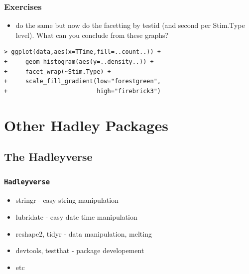 \documentclass[xcolor={table},c]{beamer}
\begin{document}
\begin{frame}[fragile]\frametitle{Exercises}
  \begin{itemize}
  \item do the same but now do the facetting by testid (and second per Stim.Type level). What can you conclude from these graphs?
  \end{itemize}
\begin{verbatim}
> ggplot(data,aes(x=TTime,fill=..count..)) +
+     geom_histogram(aes(y=..density..)) +
+     facet_wrap(~Stim.Type) +
+     scale_fill_gradient(low="forestgreen",
+                         high="firebrick3")
\end{verbatim}
\begin{center}
\end{center}
\end{frame}


\section{Other Hadley Packages}


\subsection{The Hadleyverse}
\begin{frame}\frametitle{\texttt{Hadleyverse}}
  \begin{itemize}
  \item stringr - easy string manipulation
  \item lubridate - easy date time manipulation
  \item reshape2, tidyr - data manipulation, melting
  \item devtools, testthat - package developement
  \item etc
  \end{itemize}
\end{frame}


\appendix
\flushlinkimages
\end{document}
